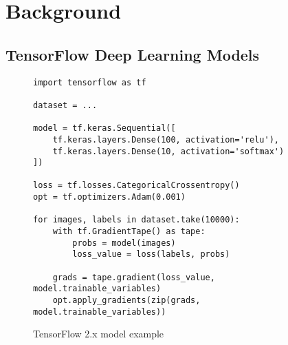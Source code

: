 \section{Background}\label{sec:background}

\subsection{TensorFlow Deep Learning Models}


\begin{figure}[ht!]
  \centering
  \begin{lstlisting}[style=mpython]
import tensorflow as tf

dataset = ...

model = tf.keras.Sequential([
    tf.keras.layers.Dense(100, activation='relu'),
    tf.keras.layers.Dense(10, activation='softmax')
])

loss = tf.losses.CategoricalCrossentropy()
opt = tf.optimizers.Adam(0.001)

for images, labels in dataset.take(10000):
    with tf.GradientTape() as tape:
        probs = model(images)
        loss_value = loss(labels, probs)

    grads = tape.gradient(loss_value, model.trainable_variables)
    opt.apply_gradients(zip(grads, model.trainable_variables)) \end{lstlisting}
  \caption{TensorFlow 2.x model example}
\label{fig:back:tf2}
\end{figure}

